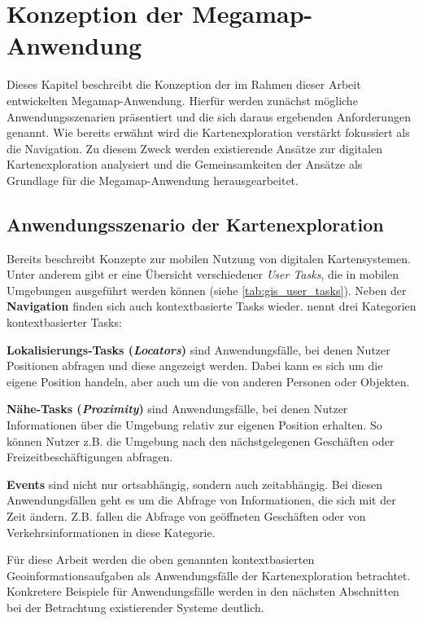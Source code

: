 \chapter{Konzeption der Megamap-Anwendung}
\label{chap:concept}
Dieses Kapitel beschreibt die Konzeption der im Rahmen dieser Arbeit entwickelten Megamap-Anwendung.
Hierfür werden zunächst mögliche Anwendungsszenarien präsentiert und die sich daraus ergebenden Anforderungen genannt.
Wie bereits erwähnt wird die Kartenexploration verstärkt fokussiert als die Navigation.
Zu diesem Zweck werden existierende Ansätze zur digitalen Kartenexploration analysiert und die Gemeinsamkeiten der Ansätze als Grundlage für die Megamap-Anwendung herausgearbeitet.

\section{Anwendungsszenario der Kartenexploration}
\label{sec:reichenbacher_use_cases}
Bereits \textcite{Reichenbacher2001} beschreibt Konzepte zur mobilen Nutzung von digitalen Kartensystemen.
Unter anderem gibt er eine Übersicht verschiedener \emph{User Tasks}, die in mobilen Umgebungen ausgeführt werden können (siehe \autoref{tab:gis_user_tasks}).
Neben der \textbf{Navigation} finden sich auch kontextbasierte Tasks wieder.
\citeauthor{Reichenbacher2001} nennt drei Kategorien kontextbasierter Tasks:

\textbf{Lokalisierungs-Tasks (\emph{Locators})} sind Anwendungsfälle, bei denen Nutzer Positionen abfragen und diese angezeigt werden.
Dabei kann es sich um die eigene Position handeln, aber auch um die von anderen Personen oder Objekten.

\textbf{Nähe-Tasks (\emph{Proximity})} sind Anwendungsfälle, bei denen Nutzer Informationen über die Umgebung relativ zur eigenen Position erhalten.
So können Nutzer z.B. die Umgebung nach den nächstgelegenen Geschäften oder Freizeitbeschäftigungen abfragen.

\textbf{Events} sind nicht nur ortsabhängig, sondern auch zeitabhängig.
Bei diesen Anwendungsfällen geht es um die Abfrage von Informationen, die sich mit der Zeit ändern.
Z.B. fallen die Abfrage von geöffneten Geschäften oder von Verkehrsinformationen in diese Kategorie.

Für diese Arbeit werden die oben genannten kontextbasierten Geoinformationsaufgaben als Anwendungsfälle der Kartenexploration betrachtet.
Konkretere Beispiele für Anwendungsfälle werden in den nächsten Abschnitten bei der Betrachtung existierender Systeme deutlich.

